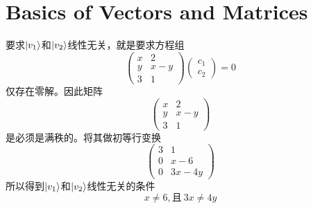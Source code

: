 \section{Basics of Vectors and Matrices}
\exercise

要求$\ket{v_1}$和$\ket{v_2}$线性无关，就是要求方程组
\[
\begin{pmatrix}
x & 2 \\
y & x - y \\
3 & 1
\end{pmatrix}
\begin{pmatrix}
c_1 \\ c_2
\end{pmatrix}
= 0
\]
仅存在零解。因此矩阵
\[
\begin{pmatrix}
x & 2 \\
y & x - y \\
3 & 1
\end{pmatrix}
\]
是必须是满秩的。将其做初等行变换
\[
\begin{pmatrix}
3 & 1 \\
0 & x - 6 \\
0 & 3x - 4y
\end{pmatrix}
\]
所以得到$\ket{v_1}$和$\ket{v_2}$线性无关的条件
\[
x \neq 6, \text{且}\ 3x \neq 4y
\]
